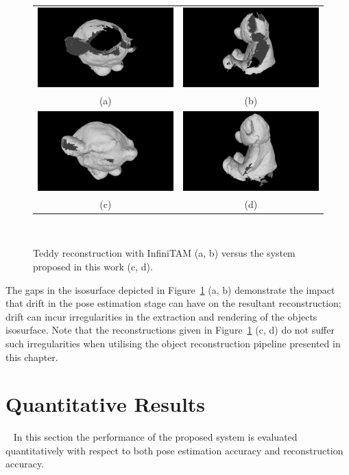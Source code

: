 \begin{figure}[!htbp]
	\centering
	\begin{tabular}{cc}
		\includegraphics[width=.2\linewidth]{figures/object_recon/gappy/one_scene00.png}&
    \includegraphics[width=.2\linewidth]{figures/object_recon/gappy/one_scene01.png}\\
    (a) & (b) \\
		\includegraphics[width=.2\linewidth]{figures/object_recon/gappy/multi_scene00.png}&
    \includegraphics[width=.2\linewidth]{figures/object_recon/gappy/multi_scene01.png}\\
    (c) & (d)\\
	\end{tabular}
  \caption[Probabilistic Object Reconstruction Qualitative Results V]
  {
    Teddy reconstruction with InfiniTAM (a, b) versus the system proposed in this 
    work (c, d).
  }
~\label{figure:probobj_gappy_teddy}
\end{figure}

The gaps in the isosurface depicted in Figure~\ref{figure:probobj_gappy_teddy} (a, b) 
demonstrate the impact that drift in the pose estimation stage can have on the resultant 
reconstruction; drift can incur irregularities in the extraction and rendering of the objects 
isosurface. Note that the reconstructions given in Figure~\ref{figure:probobj_gappy_teddy} 
(c, d) do not suffer such irregularities when utilising the object reconstruction pipeline 
presented in this chapter.

\section{Quantitative Results}
~\label{sec:probobj_quantitative}
In this section the performance of the proposed system is evaluated quantitatively with respect 
to both pose estimation accuracy and reconstruction accuracy. 

